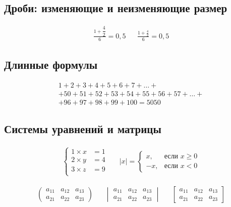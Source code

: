\subsection{Дроби: изменяющие и неизменяющие размер}


\begin{align*}
    \frac{1+\dfrac{4}{2}}{6} = 0,5
     &  &
    \frac{1+\frac{4}{2}}{6} = 0,5
\end{align*}

\subsection{Длинные формулы}
\begin{multline}
    1+2+3+4+5+6+7+\dots + \\
    + 50+51+52+53+54+55+56+57 + \dots + \\
    + 96+97+98+99+100=5050
\end{multline}

\subsection{Системы уравнений и матрицы}

\begin{align*}
    \left\{
    \begin{aligned}
        1\times x & = 1 \\
        2\times y & = 4 \\
        3\times z & = 9 \\
    \end{aligned}
    \right.
     &  &
    |x|=
    \begin{cases}
        x,  & \text{если }  x \ge 0 \\
        -x, & \text{если } x<0
    \end{cases}
\end{align*}

\begin{align*}
    \begin{pmatrix}
        a_{11} & a_{12} & a_{13} \\
        a_{21} & a_{22} & a_{23}
    \end{pmatrix}
     &  &
    \begin{vmatrix}
        a_{11} & a_{12} & a_{13} \\
        a_{21} & a_{22} & a_{23}
    \end{vmatrix}
     &  &
    \begin{bmatrix}
        a_{11} & a_{12} & a_{13} \\
        a_{21} & a_{22} & a_{23}
    \end{bmatrix}
\end{align*}

